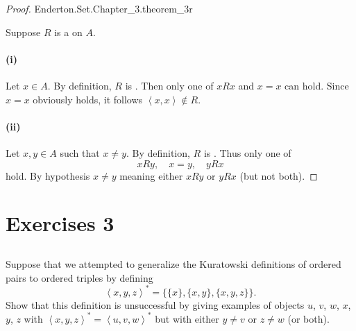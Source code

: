 \documentclass{report}
\newcommand{\pair}[1]{\left< #1 \right>}
\begin{document}
\begin{proof}

    {Enderton.Set.Chapter\_3.theorem\_3r}

  Suppose $R$ is a  on $A$.

  \paragraph{(i)}%

    Let $x \in A$.
    By definition, $R$ is .
    Then only one of $xRx$ and $x = x$ can hold.
    Since $x = x$ obviously holds, it follows $\pair{x, x} \not\in R$.

  \paragraph{(ii)}%

    Let $x, y \in A$ such that $x \neq y$.
    By definition, $R$ is .
    Thus only one of $$xRy, \quad x = y, \quad yRx$$ hold.
    By hypothesis $x \neq y$ meaning either $xRy$ or $yRx$ (but not both).

\end{proof}

\section{Exercises 3}%

\subsection{}%

Suppose that we attempted to generalize the Kuratowski definitions of ordered
  pairs to ordered triples by defining
  $$\pair{x, y, z}^* = \{\{x\}, \{x, y\}, \{x, y, z\}\}.$$
Show that this definition is unsuccessful by giving examples of objects
  $u$, $v$, $w$, $x$, $y$, $z$ with
  $\pair{x, y, z}^* = \pair{u, v, w}^*$ but with either
  $y \neq v$ or $z \neq w$ (or both).
\end{document}
